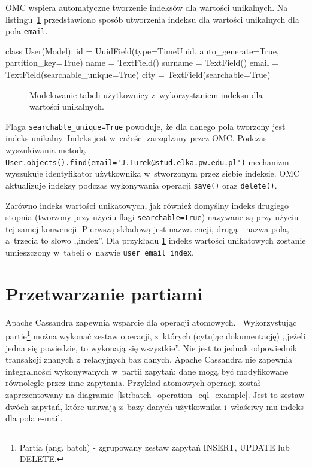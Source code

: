 OMC wspiera automatyczne tworzenie indeksów dla wartości unikalnych. Na listingu~\ref{lst:omc_unique_index_modeling} przedstawiono sposób utworzenia indeksu dla wartości unikalnych dla pola \verb+email+.

\begin{verbbox}
class User(Model):
    id = UuidField(type=TimeUuid, auto_generate=True, partition_key=True)
    name = TextField()
    surname = TextField()
    email = TextField(searchable_unique=True)
    city = TextField(searchable=True)
\end{verbbox}

\begin{figure}[ht!]
	\centering
	\theverbbox
	\caption{Modelowanie tabeli użytkownicy z~wykorzystaniem indeksu dla wartości unikalnych.}
	\label{lst:omc_unique_index_modeling}
\end{figure}

Flaga \verb+searchable_unique=True+ powoduje, że dla danego pola tworzony jest indeks unikalny. Indeks jest w~całości zarządzany przez OMC. Podczas wyszukiwania metodą \verb+User.objects().find(email='J.Turek@stud.elka.pw.edu.pl')+ mechanizm wyszukuje identyfikator użytkownika w~stworzonym przez siebie indeksie. OMC aktualizuje indeksy podczas wykonywania operacji \verb+save()+ oraz \verb+delete()+.

Zarówno indeks wartości unikatowych, jak również domyślny indeks drugiego stopnia (tworzony przy użyciu flagi \verb+searchable=True+) nazywane są przy użyciu tej samej konwencji. Pierwszą składową jest nazwa encji, drugą - nazwa pola, a~trzecia to słowo ,,index''. Dla przykładu \ref{lst:omc_unique_index_modeling} indeks wartości unikatowych zostanie umieszczony w~tabeli o~nazwie \verb+user_email_index+.

\section{Przetwarzanie partiami}

Apache Cassandra zapewnia wsparcie dla operacji atomowych.~\cite{cassandra_batch_operations} Wykorzystując partie\footnote{Partia (ang. batch) - zgrupowany zestaw zapytań INSERT, UPDATE lub DELETE.} można wykonać zestaw operacji, z~których (cytując dokumentację) ,,jeżeli jedna się powiedzie, to wykonają się wszystkie''. Nie jest to jednak odpowiednik transakcji znanych z~relacyjnych baz danych. Apache Cassandra nie zapewnia integralności wykonywanych w~partii zapytań: dane mogą być modyfikowane równolegle przez inne zapytania. Przykład atomowych operacji został zaprezentowany na diagramie~\ref{lst:batch_operation_cql_example}. Jest to zestaw dwóch zapytań, które usuwają z~bazy danych użytkownika i~właściwy mu indeks dla pola e-mail.

